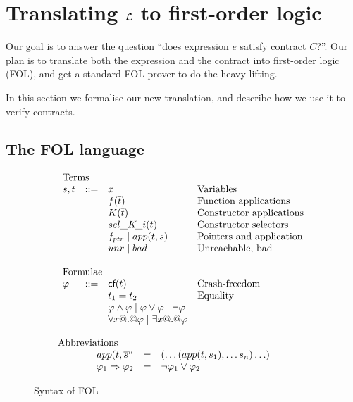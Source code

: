 \section{Translating $\cal L$ to first-order logic} \label{ssect:denot-fol}

Our goal is to answer the question ``does expression $e$ satisfy
contract $C$?''.  Our plan is to translate both the expression and the
contract into first-order logic (FOL), and get a standard FOL prover
to do the heavy lifting.  

In this section we formalise our new translation, and describe how we use it to
verify contracts.

\subsection{The FOL language}

\begin{figure}
\[\begin{array}{c} 
\begin{array}{lrll}
\multicolumn{3}{l}{\text{Terms}} \\
  s,t & ::=  & x                          & \text{Variables} \\ 
      & \mid & f(\ol{t})                  & \text{Function applications} \\
      & \mid & K(\ol{t})                  & \text{Constructor applications} \\ 
      & \mid & \sel{K}{i}(t)              & \text{Constructor selectors} \\ 
      & \mid & f_{ptr} \mid app(t,s)       & \text{Pointers and application} \\
      & \mid & \unr \mid \bad             & \text{Unreachable, bad} \\ \\
\multicolumn{3}{l}{\text{Formulae}} \\ 
 \phi & ::=  & \lcf{t}    & \text{Crash-freedom} \\
      & \mid & t_1 = t_2  & \text{Equality} \\ 
      & \mid & \phi \land \phi \mid \phi \lor \phi \mid \neg \phi \\
      & \mid & \forall x @.@ \phi \mid \exists x @.@ \phi \\ \\ 
\end{array}
\\
\multicolumn{1}{l}{\text{Abbreviations}} \\ 
\begin{array}{rcl}
app(t,\oln{s}{n} & = & (\ldots(app(t,s_1),\ldots s_n)\ldots) \\
\phi_1 \Rightarrow \phi_2 & = & \neg \phi_1 \lor \phi_2
\end{array}
\end{array}\]
\caption{Syntax of FOL}\label{fig:fol-image}
\end{figure}

